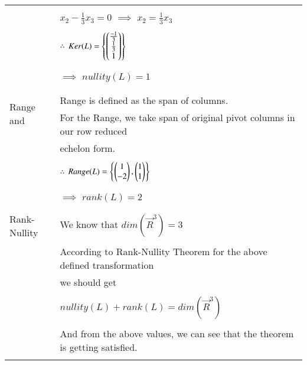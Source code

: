 \documentclass[journal,12pt]{IEEEtran}
\begin{document}
\begin{longtable}{|l|l|}
		& \\
		& \qquad \qquad $x_2 - \frac{1}{3}x_3 = 0$ $\implies$ $x_2 = \frac{1}{3}x_3$ \\
		& \\
		& $\therefore$ $Ker(L) = \left\{\begin{pmatrix}\frac{-1}{3}\\\frac{1}{3}\\1\end{pmatrix}\right\}$ \\
		& \\
		& $\implies$ $nullity(L) = 1$ \\
		& \\
		\hline
		\multirow{3}{*}{Range and}   
		& \\ 
		& Range is defined as the span of columns. \\ Rank
		& For the Range, we take span of original pivot columns in our row reduced \\ 
		& echelon form. \\
		& \\
		& $\therefore$ $Range(L) = \left\{\begin{pmatrix}1\\-2\end{pmatrix}, \begin{pmatrix}1\\1\end{pmatrix}\right\} $ \\
		& \\
		& $\implies$ $rank(L) = 2$ \\
		& \\
		\hline
		\multirow{3}{*}{Rank-Nullity}   
		& \\ 
		& We know that $dim(\vec{R}^3) = 3$ \\ Theorem
		& \\
		& According to Rank-Nullity Theorem for the above defined transformation \\  
		& we should get\\ 
		& \\
		& \qquad \qquad \qquad $nullity(L) + rank(L) = dim(\vec{R}^3)$ \\
		& \\
		& And from the above values, we can see that the theorem is getting satisfied.\\
		& \\
		\hline
	\end{longtable}
		
\end{document}
